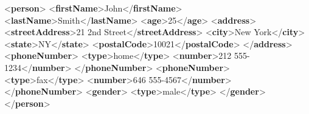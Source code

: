 \documentclass[
  12pt,
]{style/krantz}
\newenvironment{Shaded}{\begin{snugshade}}{\end{snugshade}}
\newcommand{\KeywordTok}[1]{\textcolor[rgb]{0.13,0.29,0.53}{\textbf{#1}}}
\newcommand{\NormalTok}[1]{#1}
\begin{document}
\begin{Shaded}
\begin{Highlighting}[]
\NormalTok{\textless{}}\KeywordTok{person}\NormalTok{\textgreater{}}
\NormalTok{  \textless{}}\KeywordTok{firstName}\NormalTok{\textgreater{}John\textless{}/}\KeywordTok{firstName}\NormalTok{\textgreater{}}
\NormalTok{  \textless{}}\KeywordTok{lastName}\NormalTok{\textgreater{}Smith\textless{}/}\KeywordTok{lastName}\NormalTok{\textgreater{}}
\NormalTok{  \textless{}}\KeywordTok{age}\NormalTok{\textgreater{}25\textless{}/}\KeywordTok{age}\NormalTok{\textgreater{}}
\NormalTok{  \textless{}}\KeywordTok{address}\NormalTok{\textgreater{}}
\NormalTok{    \textless{}}\KeywordTok{streetAddress}\NormalTok{\textgreater{}21 2nd Street\textless{}/}\KeywordTok{streetAddress}\NormalTok{\textgreater{}}
\NormalTok{    \textless{}}\KeywordTok{city}\NormalTok{\textgreater{}New York\textless{}/}\KeywordTok{city}\NormalTok{\textgreater{}}
\NormalTok{    \textless{}}\KeywordTok{state}\NormalTok{\textgreater{}NY\textless{}/}\KeywordTok{state}\NormalTok{\textgreater{}}
\NormalTok{    \textless{}}\KeywordTok{postalCode}\NormalTok{\textgreater{}10021\textless{}/}\KeywordTok{postalCode}\NormalTok{\textgreater{}}
\NormalTok{  \textless{}/}\KeywordTok{address}\NormalTok{\textgreater{}}
\NormalTok{  \textless{}}\KeywordTok{phoneNumber}\NormalTok{\textgreater{}}
\NormalTok{    \textless{}}\KeywordTok{type}\NormalTok{\textgreater{}home\textless{}/}\KeywordTok{type}\NormalTok{\textgreater{}}
\NormalTok{    \textless{}}\KeywordTok{number}\NormalTok{\textgreater{}212 555{-}1234\textless{}/}\KeywordTok{number}\NormalTok{\textgreater{}}
\NormalTok{  \textless{}/}\KeywordTok{phoneNumber}\NormalTok{\textgreater{}}
\NormalTok{  \textless{}}\KeywordTok{phoneNumber}\NormalTok{\textgreater{}}
\NormalTok{    \textless{}}\KeywordTok{type}\NormalTok{\textgreater{}fax\textless{}/}\KeywordTok{type}\NormalTok{\textgreater{}}
\NormalTok{    \textless{}}\KeywordTok{number}\NormalTok{\textgreater{}646 555{-}4567\textless{}/}\KeywordTok{number}\NormalTok{\textgreater{}}
\NormalTok{  \textless{}/}\KeywordTok{phoneNumber}\NormalTok{\textgreater{}}
\NormalTok{  \textless{}}\KeywordTok{gender}\NormalTok{\textgreater{}}
\NormalTok{    \textless{}}\KeywordTok{type}\NormalTok{\textgreater{}male\textless{}/}\KeywordTok{type}\NormalTok{\textgreater{}}
\NormalTok{  \textless{}/}\KeywordTok{gender}\NormalTok{\textgreater{}}
\NormalTok{\textless{}/}\KeywordTok{person}\NormalTok{\textgreater{}}
\end{Highlighting}
\end{Shaded}
\end{document}
